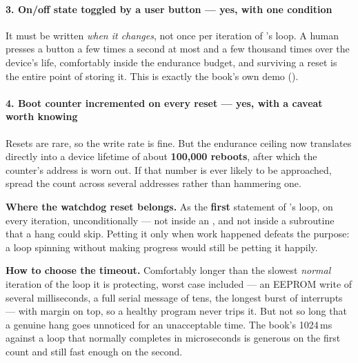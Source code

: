 \paragraph{3. On/off state toggled by a user button --- yes, with one condition}
It must be written \emph{when it changes}, not once per iteration of 's loop. A human
presses a button a few times a second at most and a few thousand times over the device's life,
comfortably inside the endurance budget, and surviving a reset is the entire point of storing it.
This is exactly the book's own demo ().

\paragraph{4. Boot counter incremented on every reset --- yes, with a caveat worth knowing}
Resets are rare, so the write rate is fine. But the endurance ceiling now translates directly into
a device lifetime of about \textbf{100,000 reboots}, after which the counter's address is worn out.
If that number is ever likely to be approached, spread the count across several addresses rather
than hammering one.

\medskip \textbf{Where the watchdog reset belongs.} As the \textbf{first} statement of
's loop, on every iteration, unconditionally --- not inside an , and not
inside a subroutine that a hang could skip. Petting it only when work happened defeats the purpose:
a loop spinning without making progress would still be petting it happily. 

\textbf{How to choose the timeout.} Comfortably longer than the slowest \emph{normal} iteration of
the loop it is protecting, worst case included --- an EEPROM write of several milliseconds, a full
serial message of tens, the longest burst of interrupts --- with margin on top, so a healthy program
never trips it. But not so long that a genuine hang goes unnoticed for an unacceptable time. The
book's 1024\,ms against a loop that normally completes in microseconds is generous on the first
count and still fast enough on the second. 



